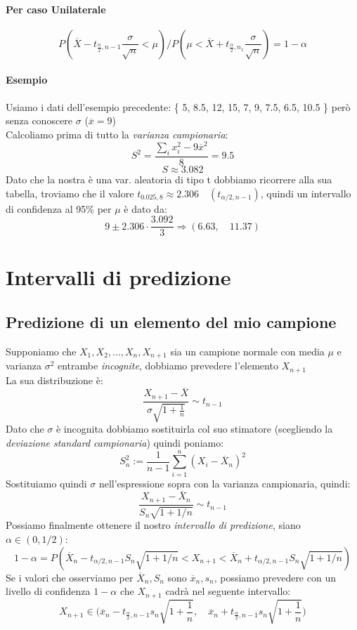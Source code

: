 \documentclass[]{article}
\begin{document}
    \paragraph{Per caso Unilaterale}
    \[ P \left( \overline{X} - t_{\frac{\alpha}{2}, n-1} \frac{\sigma}{\sqrt{n}} < \mu \right) /  P \left( \mu < \overline{X} + t_{\frac{\alpha}{2}, n_1} \frac{\sigma}{\sqrt{n}}\right) = 1 - \alpha \]
    \paragraph{Esempio} Usiamo i dati dell'esempio precedente: \{ 5, 8.5, 12, 15, 7, 9, 7.5, 6.5, 10.5 \} però senza conoscere $\sigma$ ($\overline{x} = 9$)\\
    Calcoliamo prima di tutto la \textit{varianza campionaria}:
    \[ S^2 = \frac{\sum_{i}^{} x^2_i - 9\overline{x}^2}{8} = \boldsymbol{9.5} \]
    \[ S \approx 3.082 \]
    Dato che la nostra è una var. aleatoria di tipo t dobbiamo ricorrere alla sua tabella, troviamo che il valore $t_{0.025,8} \approx 2.306 \quad (t_{\alpha/2, n-1})$, quindi un intervallo di confidenza al 95\% per $\mu$ è dato da:
    \[ 9 \pm 2.306 \cdot \frac{3.092}{3} \Longrightarrow (6.63, \quad 11.37) \]
    \newpage
    \section{Intervalli di predizione}
    \subsection{Predizione di un elemento del mio campione}
    Supponiamo che $X_1, X_2, \ldots, X_n, X_{n+1}$ sia un campione normale con media $\mu$ e varianza $\sigma^2$ entrambe \textit{incognite}, dobbiamo prevedere l'elemento $X_{n+1}$ \\
    La sua distribuzione è:
    $$ \frac{X_{n+1}-\overline{X}}{\sigma\sqrt{1+\frac{1}{n}}} \sim t_{n-1} $$
    Dato che $\sigma$ è incognita dobbiamo sostituirla col suo stimatore (scegliendo la \textit{deviazione standard campionaria}) quindi poniamo:
    \[ S^2_n := \frac{1}{n -1} \sum_{i= 1}^{n} (X_i - \overline{X}_n)^2 \]
    Sostituiamo quindi $\sigma$ nell'espressione sopra con la varianza campionaria, quindi:
    \[ \frac{X_{n+1} - \overline{X}_n}{S_n \sqrt{1 + 1/n}} \sim t_{n-1} \]
    Possiamo finalmente ottenere il nostro \textit{intervallo di predizione}, siano $\alpha \in (0,1 /2)$:
    \[ 1 - \alpha = P \left( \overline{X}_n - t_{\alpha / 2, n-1} S_n \sqrt{1 + 1 / n} < X_{n+1} < \overline{X}_n + t_{\alpha / 2, n-1} S_n \sqrt{1+1/n} \right) \]
    Se i valori che osserviamo per $\overline{X}_n, S_n$ sono $\overline{x}_n, s_n$, possiamo prevedere con un livello di confidenza $1 -\alpha$ che $X_{n+1}$ cadrà nel seguente intervallo:
    \[ X_{n+1} \in \Big(\overline{x}_n-t_{\frac{\alpha}{2}, n-1} s_n\sqrt{1+\frac{1}{n}}, \quad \overline{x}_n+t_{\frac{\alpha}{2}, n-1} s_n\sqrt{1+\frac{1}{n}}\Big) \]
\end{document}

